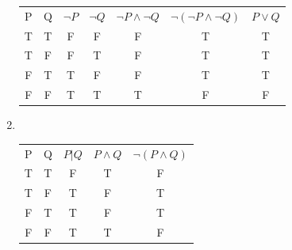 \documentclass[12pt]{exam}
\begin{document}
\begin{enumerate}
        \begin{table}[h]
            \centering 
            \label{tab:example_table}
            
            \begin{tabular}{ccccccc}
                
                P & Q & $ \lnot P $ & $ \lnot Q $ & $ \lnot P \land \lnot Q $ & $ \lnot ( \lnot P \land \lnot Q ) $ & $ P \lor Q $ \\
                
                T       & T       & F       & F       & F       & T       & T       \\
                T       & F       & F       & T       & F       & T       & T       \\
                F       & T       & T       & F       & F       & T       & T       \\
                F       & F       & T       & T       & T       & F       & F       \\
                
                
            \end{tabular}
        \end{table}
    
    \addtocounter{enumi}{1}

    \item ~\\
    

        \begin{table}[h]
            \centering 
            \label{tab:example_table}
            
            \begin{tabular}{ccccc}
                
                P & Q & $ P | Q $ & $ P \land Q $ & $ \lnot ( P \land Q ) $ \\
                
                T       & T       & F       & T       & F       \\
                T       & F       & T       & F       & T       \\
                F       & T       & T       & F       & T       \\
                F       & F       & T       & T       & F       \\
                
                
            \end{tabular}
        \end{table}


\end{enumerate}
\end{document}
